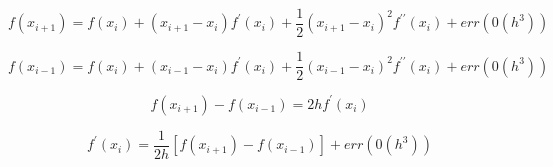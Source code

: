 \documentclass[12pt]{article}
\begin{document}
\begin{equation}
 f(x_{i+1}) = f(x_i) + (x_{i+1} - x_i)f^{\prime}(x_i) + \frac{1}{2}(x_{i+1} - x_i)^2 f^{\prime\prime}(x_i) + err(0(h^3))
\end {equation}

\begin{equation}
 f(x_{i-1}) = f(x_i) + (x_{i-1} - x_i) f^{\prime}(x_i) + \frac{1}{2}(x_{i-1} - x_i)^2 f^{\prime\prime}(x_i) + err(0(h^3))
\end {equation}

\begin{equation}
 f(x_{i+1}) - f(x_{i-1}) = 2hf^{\prime}(x_i)
\end {equation}

\begin{equation}
 f^{\prime}(x_i) = \frac{1}{2h}[f(x_{i+1}) - f(x_{i-1})] + err(0(h^3))
 \end {equation}
\end{document}
